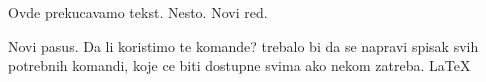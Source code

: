 Ovde prekucavamo tekst. Nesto.
Novi red.

Novi pasus. Da li koristimo te komande?
trebalo bi da se napravi spisak svih potrebnih komandi, koje ce biti dostupne svima ako nekom zatreba. 
\LaTeX
